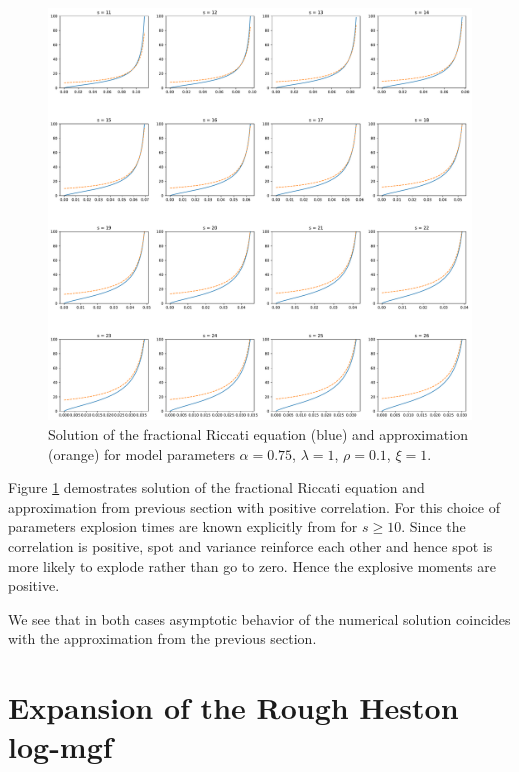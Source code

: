 \documentclass[12pt]{article}
\theoremstyle{plain}
\begin{document}
\begin{figure}[H]
    \centering
    \includegraphics[width=\textwidth]{figures/FractionalRiccatiApproximationPositiveCorrelation.pdf}
    \caption{Solution of the fractional Riccati equation (blue) and approximation (orange) for model parameters $\alpha=0.75$, $\lambda=1$, $\rho = 0.1$, $\xi = 1$.}
    \label{fig:FractionalRiccatiApproximationPositiveCorrelation}
\end{figure}

Figure \ref{fig:FractionalRiccatiApproximationPositiveCorrelation} demostrates solution of the fractional Riccati equation and approximation from previous section with positive correlation. For this choice of parameters explosion times are known explicitly from \cite{GGP18} for $s \geq 10$. Since the correlation is positive, spot and variance reinforce each other and hence spot is more likely to explode rather than go to zero. Hence the explosive moments are positive.

We see that in both cases asymptotic behavior of the numerical solution coincides with the approximation from the previous section.

\section{Expansion of the Rough Heston log-mgf}
\end{document}
